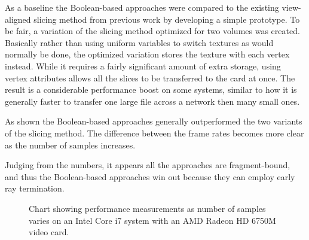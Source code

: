\documentclass{report}
\begin{document}
As a baseline the Boolean-based approaches were compared to the existing
view-aligned slicing method from previous work by developing a simple prototype.
To be fair, a variation of the slicing method optimized for two volumes was
created.  Basically rather than using uniform variables to switch textures as
would normally be done, the optimized variation stores the texture with each
vertex instead.  While it requires a fairly significant amount of extra storage,
using vertex attributes allows all the slices to be transferred to the card at
once.  The result is a considerable performance boost on some systems, similar
to how it is generally faster to transfer one large file across a network then
many small ones.

As shown the Boolean-based approaches generally outperformed the two variants of
the slicing method.  The difference between the frame rates becomes more clear
as the number of samples increases.

Judging from the numbers, it appears all the approaches are fragment-bound, and
thus the Boolean-based approaches win out because they can employ early ray
termination.

\begin{figure}
\centering
{}
\caption{
Chart showing performance measurements as number of samples varies on an Intel
Core i7 system with an AMD Radeon HD 6750M video card.
}
\label{macbook-performance-chart}
\end{figure}
\end{document}
